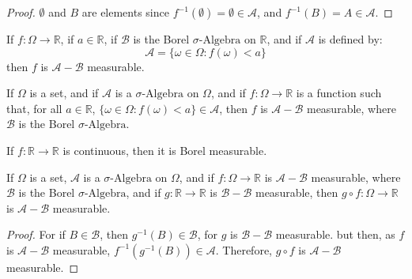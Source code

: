                 \begin{proof}
                    $\emptyset$ and $B$ are elements since
                    $f^{-1}(\emptyset)=\emptyset\in\mathcal{A}$, and
                    $f^{-1}(B)=A\in\mathcal{A}$.
                \end{proof}
                \begin{theorem}
                    If $f:\Omega\rightarrow\mathbb{R}$, if $a\in\mathbb{R}$,
                    if $\mathcal{B}$ is the Borel $\sigma\text{-Algebra}$ on
                    $\mathbb{R}$, and if $\mathcal{A}$ is defined by:
                    \begin{equation}
                        \mathcal{A}=\{\omega\in\Omega:f(\omega)<a\}
                    \end{equation}
                    then $f$ is $\mathcal{A}-\mathcal{B}$ measurable.
                \end{theorem}
                \begin{theorem}
                    If $\Omega$ is a set, and if $\mathcal{A}$ is a
                    $\sigma\text{-Algebra}$ on $\Omega$, and if
                    $f:\Omega\rightarrow\mathbb{R}$ is a function such that,
                    for all $a\in\mathbb{R}$,
                    $\{\omega\in\Omega:f(\omega)<a\}\in\mathcal{A}$, then
                    $f$ is $\mathcal{A}-\mathcal{B}$ measurable, where
                    $\mathcal{B}$ is the Borel $\sigma\text{-Algebra}$.
                \end{theorem}
                \begin{theorem}
                    If $f:\mathbb{R}\rightarrow\mathbb{R}$ is continuous,
                    then it is Borel measurable.
                \end{theorem}
                \begin{theorem}
                    If $\Omega$ is a set, $\mathcal{A}$ is a
                    $\sigma\text{-Algebra}$ on $\Omega$, and if
                    $f:\Omega\rightarrow\mathbb{R}$ is
                    $\mathcal{A}-\mathcal{B}$ measurable, where
                    $\mathcal{B}$ is the Borel $\sigma\text{-Algebra}$, and
                    if $g:\mathbb{R}\rightarrow\mathbb{R}$ is
                    $\mathcal{B}-\mathcal{B}$ measurable, then
                    $g\circ{f}:\Omega\rightarrow\mathbb{R}$ is
                    $\mathcal{A}-\mathcal{B}$ measurable.
                \end{theorem}
                \begin{proof}
                    For if $B\in\mathcal{B}$, then
                    $g^{-1}(B)\in\mathcal{B}$, for $g$ is
                    $\mathcal{B}-\mathcal{B}$ measurable. but then,
                    as $f$ is $\mathcal{A}-\mathcal{B}$ measurable,
                    $f^{-1}(g^{-1}(B))\in\mathcal{A}$. Therefore,
                    $g\circ{f}$ is $\mathcal{A}-\mathcal{B}$ measurable.
                \end{proof}
